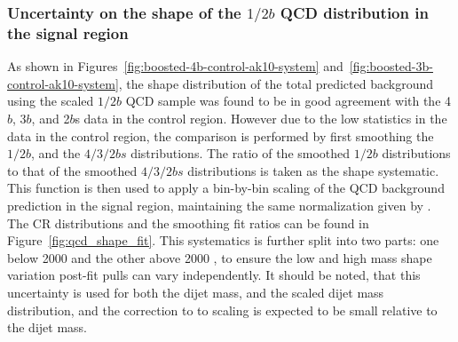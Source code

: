 \clearpage
\subsubsection{Uncertainty on the shape of the $1/2b$ QCD distribution in the signal region}
\label{unc-shape-qcd-in-sr}

As shown in Figures~\ref{fig:boosted-4b-control-ak10-system} and~\ref{fig:boosted-3b-control-ak10-system}, the shape distribution of the total predicted background using the scaled $1/2b$ QCD sample was found to be in good agreement with the 4$b$, 3$b$, and 2$b$s data in the control region.  However due to the low statistics in the data in the control region, the comparison is performed by first smoothing the $1/2b$, and the $4/3/2bs$ distributions. The ratio of the smoothed $1/2b$ distributions to that of the smoothed $4/3/2bs$ distributions is taken as the shape systematic. This function is then used to apply a bin-by-bin scaling of the QCD background prediction in the signal region, maintaining the same normalization given by \muqcd.  The CR distributions and the smoothing fit ratios can be found in Figure~\ref{fig:qcd_shape_fit}. This systematics is further split into two parts: one below 2000 \GeV and the other above 2000 \GeV, to ensure the low and high mass shape variation post-fit pulls can vary independently. It should be noted, that this uncertainty is used for both the dijet mass, and the scaled dijet mass distribution, and the correction to to scaling is expected to be small relative to the dijet mass. 

